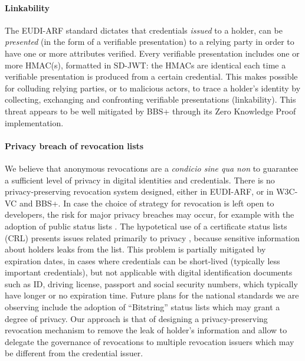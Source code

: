 \paragraph{Linkability}

The EUDI-ARF standard dictates that credentials \textit{issued} to a holder, can be \textit{presented} (in the form of a verifiable presentation) to a relying party in order to have one or more attributes verified. Every verifiable presentation includes one or more HMAC(s), formatted in SD-JWT: the HMACs are identical each time a verifiable presentation is produced from a certain credential. This makes possible for colluding relying parties, or to malicious actors, to trace a holder's identity by collecting, exchanging and confronting verifiable presentations (linkability). This threat appears to be well mitigated by BBS+ through its Zero Knowledge Proof implementation.

\paragraph{Privacy breach of revocation lists}

We believe that anonymous revocations are a \textit{condicio sine qua non} to guarantee a sufficient level of privacy in digital identities and credentials. There is no privacy-preserving revocation system designed, either in EUDI-ARF, or in W3C-VC and BBS+. In case the choice of strategy for revocation is left open to developers, the risk for major privacy breaches may occur, for example with the adoption of public status lists \cite{crlcomparison}. The hypotetical use of a certificate status lists (CRL) presents issues related primarily to privacy \cite{CRL}, because sensitive information about holders leaks from the list. This problem is partially mitigated by expiration dates, in cases where credentials can be short-lived (typically less important credentials), but not applicable with digital identification documents such as ID, driving license, passport and social security numbers, which typically have longer or no expiration time. Future plans for the national standards we are observing include the adoption of ``Bitstring'' status lists \cite{status-lists} which may grant a degree of privacy. Our approach is that of designing a privacy-preserving revocation mechanism to remove the leak of holder's information and allow to delegate the governance of revocations to multiple revocation issuers which may be different from the credential issuer.

